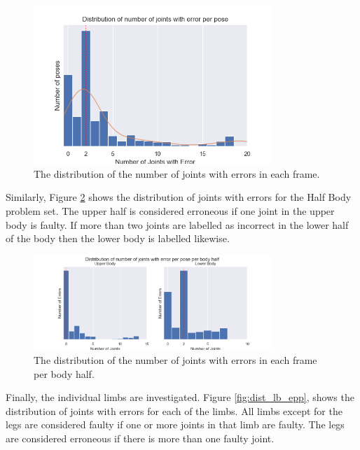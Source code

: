 \begin{figure}
  \centering
  \includegraphics[width=0.8\textwidth]{figures/Data/joint_errors_per_pose/distribution_of_joint_errors_per_pose.png}
  \caption[Number of Joints with error]{The distribution of the number of joints with errors in each frame.}
  \label{fig:dist_jt_epp}
\end{figure}

Similarly, Figure \ref{fig:dist_bh_epp} shows the distribution of joints with errors for the Half Body problem set. The upper half is considered erroneous if one joint in the upper body is faulty. If more than two joints are labelled as incorrect in the lower half of the body then the lower body is labelled likewise.

\begin{figure}
  \centering
  \includegraphics[width=0.8\textwidth]{figures/Data/joint_errors_per_pose/distribution_of_joint_errors_per_pose_per_body_half.png}
  \caption[Number of Joints with error per body half]{The distribution of the number of joints with errors in each frame per body half.}
  \label{fig:dist_bh_epp}
\end{figure}

Finally, the individual limbs are investigated. Figure \ref{fig:dist_lb_epp}, shows the distribution of joints with errors for each of the limbs. All limbs except for the legs are considered faulty if one or more joints in that limb are faulty. The legs are considered erroneous if there is more than one faulty joint.

